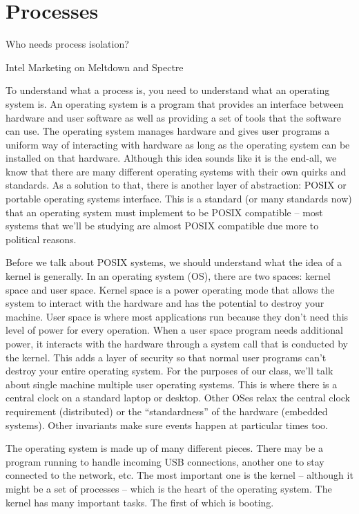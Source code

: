 \chapter{Processes}

\epigraph{Who needs process isolation?}{Intel Marketing on Meltdown and Spectre}

To understand what a process is, you need to understand what an operating system is.
An operating system is a program that provides an interface between hardware and user software as well as providing a set of tools that the software can use.
The operating system manages hardware and gives user programs a uniform way of interacting with hardware as long as the operating system can be installed on that hardware.
Although this idea sounds like it is the end-all, we know that there are many different operating systems with their own quirks and standards.
As a solution to that, there is another layer of abstraction: POSIX or portable operating systems interface.
This is a standard (or many standards now) that an operating system must implement to be POSIX compatible -- most systems that we'll be studying are almost POSIX compatible due more to political reasons.

Before we talk about POSIX systems, we should understand what the idea of a kernel is generally.
In an operating system (OS), there are two spaces: kernel space and user space.
Kernel space is a power operating mode that allows the system to interact with the hardware and has the potential to destroy your machine.
User space is where most applications run because they don't need this level of power for every operation.
When a user space program needs additional power, it interacts with the hardware through a system call that is conducted by the kernel.
This adds a layer of security so that normal user programs can't destroy your entire operating system.
For the purposes of our class, we'll talk about single machine multiple user operating systems.
This is where there is a central clock on a standard laptop or desktop.
Other OSes relax the central clock requirement (distributed) or the ``standardness'' of the hardware (embedded systems).
Other invariants make sure events happen at particular times too.

The operating system is made up of many different pieces.
There may be a program running to handle incoming USB connections, another one to stay connected to the network, etc.
The most important one is the kernel -- although it might be a set of processes -- which is the heart of the operating system.
The kernel has many important tasks.
The first of which is booting.

